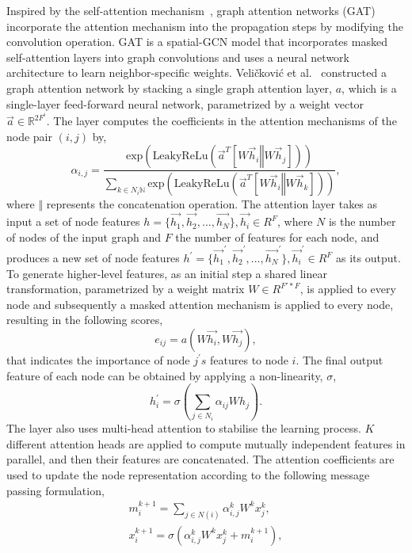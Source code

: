 Inspired by the self-attention mechanism{~}, graph attention networks (GAT){~} incorporate the attention mechanism into the propagation steps by modifying the convolution operation. 
GAT is a spatial-GCN model that incorporates masked self-attention layers into graph convolutions and uses a neural network architecture to learn neighbor-specific weights.
Veli{\v{c}}kovi{\'c} et al.~ constructed a graph attention network by stacking a single graph attention layer, $a$, which is a single-layer feed-forward neural network, parametrized by a weight vector $\vec{a} \in \mathbb{R}^{2F^{i}}$. The layer computes the coefficients in the attention mechanisms of the node pair $(i,j)$ by,
\begin{equation}
\alpha_{i,j} = \frac{ \text{exp} (\text{LeakyReLu} ( \vec{a}^T [W\vec{h}_i \mathbin\Vert W\vec{h}_j] ) ) }
{ \sum_{k \in N_i \mathbb{N} }  \text{exp} (\text{LeakyReLu} ( \vec{a}^T [W\vec{h}_i \mathbin\Vert  W\vec{h}_k] ) ) } ,
\end{equation}
where $\mathbin\Vert$ represents the concatenation operation. The attention layer takes as input a set of node features $h=\{\vec{h_1},\vec{h_2},...,\vec{h_N}\}, \vec{h_i} \in R^F$, where $N$ is the number of nodes of the input graph and $F$ the number of features for each node, and produces a new set of node features $h^{'}=\{\vec{h_1}^{'},\vec{h_2}^{'},...,\vec{h_N}^{'}\}, \vec{h_i}^{'} \in R^F$ as its output.
To generate higher-level features, as an initial step a shared linear transformation, parametrized by a weight matrix $W \in R^{F'*F}$, is applied to every node and subsequently a masked attention mechanism is applied to every node, resulting in the following scores,
\begin{equation}
e_{ij} = a ( W \vec{h_i}, W \vec{h_j} ),
\end{equation}
that indicates the importance of node $j^{'}s$ features to node $i$. The final output feature of each node can be obtained by applying a non-linearity, $\sigma$,
\begin{equation}
h_i^{'} = \sigma ( \sum_{j \in N_i} \alpha_{ij} Wh_j ).
\end{equation}
The layer also uses multi-head attention to stabilise the learning process. $K$ different attention heads are applied to compute mutually independent features in parallel, and then their features are concatenated.
The attention coefficients are used to update the node representation according to the following message passing formulation,
\begin{equation}
\begin{split}
m_i^{k+1} = \sum_{j \in N(i)} \alpha_{i,j}^k W^k x_j^k , \\
x_i^{k+1} = \sigma (\alpha_{i,j}^k W^k x_j^k + m_i^{k+1}),
\end{split}
\end{equation}


